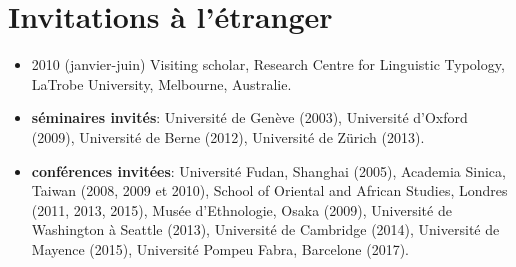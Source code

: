 \documentclass[oldfontcommands,oneside,a4paper,11pt]{article}
\begin{document}
 
  
\section*{Invitations à l'étranger}
\begin{itemize}
\item   2010 (janvier-juin) Visiting scholar, Research Centre for Linguistic Typology, LaTrobe University, Melbourne, Australie.
 \item   \textbf{séminaires invités}:  Université de Genève (2003),  Université d'Oxford (2009), Université de Berne (2012),  Université de Zürich (2013).
 \item \textbf{conférences invitées}: Université Fudan, Shanghai (2005), Academia Sinica, Taiwan (2008, 2009 et 2010), School of Oriental and African Studies, Londres (2011, 2013, 2015), Musée d'Ethnologie, Osaka (2009), Université de Washington à Seattle (2013),  Université de Cambridge (2014), Université de Mayence (2015),  Université Pompeu Fabra, Barcelone (2017).
  \end{itemize}
    
\end{document}

